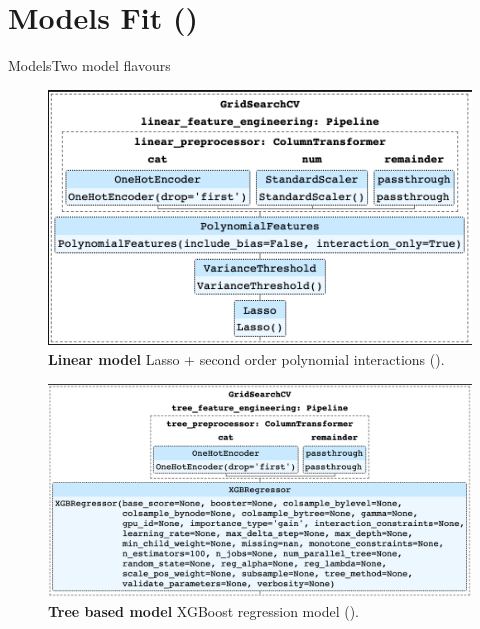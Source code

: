\documentclass[10pt]{beamer}
\begin{document}
\section{Models Fit (\cite{interpretable_ml_orduz_2021})}

\begin{frame}{Models}{Two model flavours}
\begin{center}
  \begin{figure}
    \includegraphics[scale=0.3]{images/linear_grid_search.png}
    \caption{{\bf Linear model} Lasso + second order polynomial interactions (\cite{scikit-learn}).}
  \end{figure}
\end{center}
\begin{center}
  \begin{figure}
    \includegraphics[scale=0.3]{images/tree_grid_search.png}
    \caption{{\bf Tree based model} XGBoost regression model (\cite{xgboost}).}
  \end{figure}
\end{center}
\end{frame}
\end{document}
